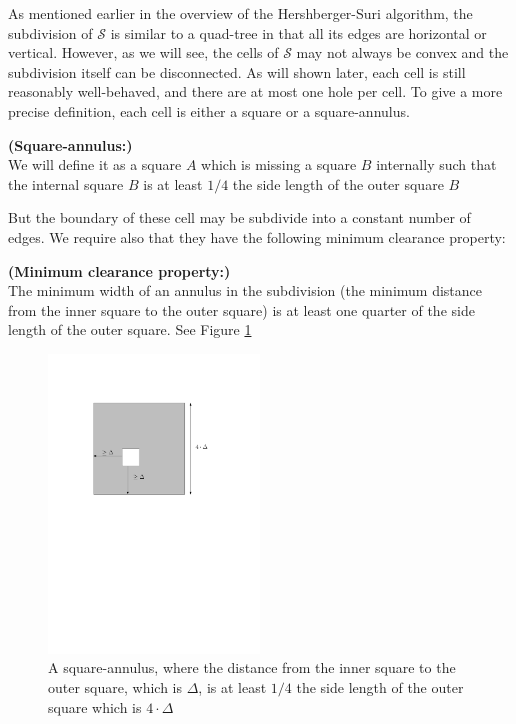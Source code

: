 As mentioned earlier in the overview of the Hershberger-Suri algorithm, the subdivision of 
$\mathcal{S}$ is similar to a quad-tree in that all its edges are horizontal or vertical. 
However, as we will see, the cells of $\mathcal{S}$ may not always be convex and the 
subdivision itself can be disconnected. As will shown later, each cell is still reasonably 
well-behaved, and there are at most one hole per cell. To give a more precise definition, 
each cell is either a square or a square-annulus.

\begin{mydef}
	\textbf{(Square-annulus:)}\\
	We will define it as a square $A$ which is missing  a square $B$ internally such that 
    the internal square $B$ is at least $1/4$ the side length of the outer square $B$
\end{mydef}

But the boundary of these cell may be subdivide into a constant number of edges.
We require also that they have the following minimum clearance property: 

\begin{mydef}
\textbf{(Minimum clearance property:)} \label{minimumclearanceproperty}\\
      The minimum width of an annulus in the subdivision (the minimum distance from the 
      inner square to the outer square) is at least one quarter of the side length of the 
      outer square. See Figure \ref{fig:minimumclearancesquareannulus}
\end{mydef}

\begin{figure}[H]
	\centering
	\includegraphics[width=0.5\textwidth]{figures/minimumclearance.pdf}
	\caption{A square-annulus, where the distance from the inner square to the outer 
  			 square, which is $\Delta$, is at least $1/4$ the side length of the outer 
             square which is $4\cdot \Delta$}
	\label{fig:minimumclearancesquareannulus}
\end{figure}

